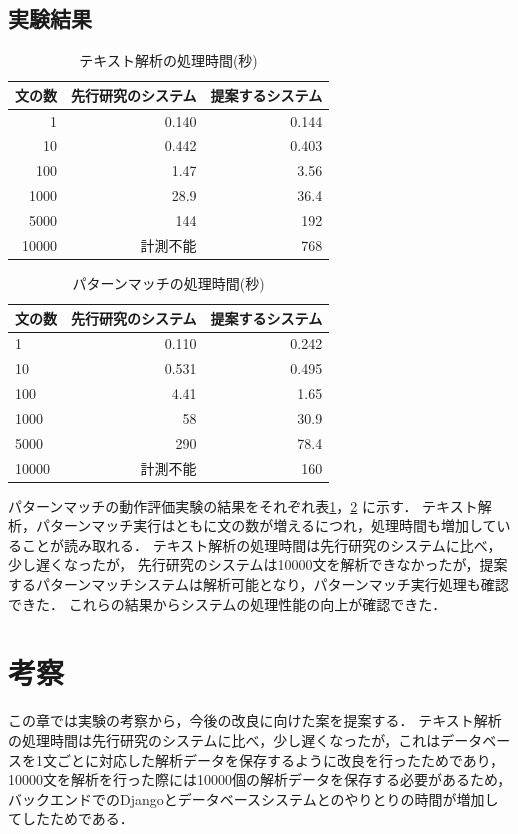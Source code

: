 \documentclass{FITpaper}
\begin{document}
\subsection{実験結果}

\begin{table}[htbp]
  \centering
    \caption{テキスト解析の処理時間(秒)}
    \label{fig:convert_time}
    \begin{tabular}{|r||r|r|}  
      \hline
      文の数 &先行研究のシステム& 提案するシステム \\\hline \hline
      1 & 0.140&0.144\\\hline
      10 & 0.442&0.403 \\\hline
      100 & 1.47 &3.56\\ \hline
      1000 & 28.9&36.4 \\\hline
      5000 &  144&192\\\hline
      10000 &  計測不能&768\\ \hline
    \end{tabular}
  \end{table}
\begin{table}[htbp]
  \centering
    \caption{パターンマッチの処理時間(秒)}
    \label{fig:matching_time}
    \begin{tabular}{|l||r|r|}  
      \hline
      文の数 & 先行研究のシステム& 提案するシステム\\ \hline \hline
      1 & 0.110&0.242\\\hline
      10 & 0.531 &0.495\\\hline
      100 & 4.41&1.65\\ \hline
      1000 & 58 &30.9 \\\hline
      5000 & 290 &78.4\\\hline
      10000 & 計測不能 &160\\ \hline
    \end{tabular}
  \end{table}


  パターンマッチの動作評価実験の結果をそれぞれ表\ref{fig:convert_time}，\ref{fig:matching_time} に示す．
  テキスト解析，パターンマッチ実行はともに文の数が増えるにつれ，処理時間も増加していることが読み取れる．
  テキスト解析の処理時間は先行研究のシステムに比べ，少し遅くなったが，
  先行研究のシステムは10000文を解析できなかったが，提案するパターンマッチシステムは解析可能となり，パターンマッチ実行処理も確認できた．
  これらの結果からシステムの処理性能の向上が確認できた．
  
\section{考察}
  この章では実験の考察から，今後の改良に向けた案を提案する．
  テキスト解析の処理時間は先行研究のシステムに比べ，少し遅くなったが，これはデータベースを1文ごとに対応した解析データを保存するように改良を行ったためであり，
  10000文を解析を行った際には10000個の解析データを保存する必要があるため，バックエンドでのDjangoとデータベースシステムとのやりとりの時間が増加してしたためである．
\end{document}

